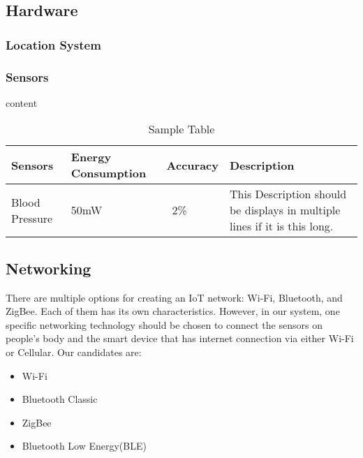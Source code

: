 \documentclass[10pt,journal,final,a4paper,nofonttune]{IEEEtran}
\begin{document}
\subsection{Hardware}

\subsubsection{Location System}
\subsubsection{Sensors} 

content

\begin{table}[h]
    \caption{Sample Table}
    \begin{center}
        \begin{tabular}{|p{1cm}|p{2cm}|p{1cm}|p{2cm}|}
            \hline
            Sensors & Energy Consumption & Accuracy & Description \\ \hline
            Blood Pressure & 50mW & ~2\% & This Description should be displays in multiple lines if it is this long. \\ 
            \hline
        \end{tabular}
    \end{center}
\end{table}





\subsection{Networking}


There are multiple options for creating an IoT network: Wi-Fi, Bluetooth, and ZigBee. 
Each of them has its own characteristics. However, in our system, one specific networking 
technology should be chosen to connect the sensors on people's body and the smart device that has 
internet connection via either Wi-Fi or Cellular. Our candidates are:
\begin{itemize}
    
    \item Wi-Fi
    \item Bluetooth Classic
    \item ZigBee
    \item Bluetooth Low Energy(BLE)

\end{itemize}
\end{document}
